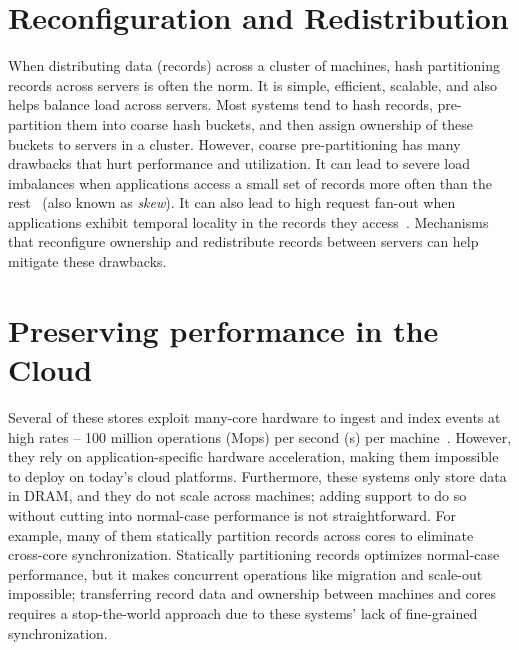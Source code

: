 \section{Reconfiguration and Redistribution}

When distributing data (records) across a cluster of
machines, hash partitioning records across
servers is often the norm.
%
It is simple, efficient, scalable, and also helps balance load
across servers.
%
Most systems tend to hash records, pre-partition them into coarse hash
buckets, and then assign ownership of these buckets to servers in a
cluster.
%
However, coarse pre-partitioning has many drawbacks that hurt
performance and utilization.
%
It can lead to severe load imbalances when applications access a small
set of records more often than the rest~\cite{slicer} (also known as
\emph{skew}).
%
It can also lead to high request fan-out when
applications exhibit temporal locality in the records they
access~\cite{rocksteady}.
%
Mechanisms that reconfigure ownership and
redistribute records between servers can help mitigate these drawbacks.

%
%

\section{Preserving performance in the Cloud}

Several of these stores exploit many-core hardware to
ingest and index events at high rates -- 100 million operations
(Mops) per second (s) per machine~\cite{mica,flexnic,floem,kvdirect}.
%
However, they rely on application-specific
hardware acceleration, making them impossible to deploy on today's cloud
platforms.
%
Furthermore, these systems only store data in DRAM, and they do not scale across
machines; adding support to do so without cutting into normal-case performance
is not straightforward.
%
For example, many of them statically partition records across cores to
eliminate cross-core synchronization.
%
Statically partitioning records optimizes normal-case performance, but
it makes concurrent
operations like migration and scale-out impossible; transferring record data
and ownership between machines and cores requires a stop-the-world approach
due to these systems' lack of fine-grained synchronization.

